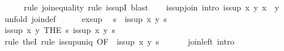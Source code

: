 \begin{isabellebody}
\ \ \ \ \isamarkupfalse%
\ {}rule\ join{}equality{}\ rule\ is{}supI{}\ blast{}\isanewline
\isanewline
\ \ \isamarkupfalse%
\ is{}sup{}join\ {}intro{}{}{}\ {}is{}sup\ x\ y\ {}x\ {}\ y{}{}\isanewline
\ \ \isamarkupfalse%
\ {}unfold\ join{}def{}\isanewline
\ \ \ \ \isamarkupfalse%
\ ex{}sup\ \isamarkupfalse%
\ s\ \ {}is{}sup\ x\ y\ s{}\ \isamarkupfalse%
\isanewline
\ \ \ \ \isamarkupfalse%
\ \isamarkupfalse%
\ {}is{}sup\ x\ y\ {}THE\ s{}\ is{}sup\ x\ y\ s{}{}\isanewline
\ \ \ \ \ \ \isamarkupfalse%
\ {}rule\ theI{}\ {}rule\ is{}sup{}uniq\ {}OF\ {}\ {}is{}sup\ x\ y\ s{}{}{}\isanewline
\ \ \isamarkupfalse%
\isanewline
\isanewline
\ \ \isamarkupfalse%
\ join{}left\ {}intro{}{}{}\isanewline

\end{isabellebody}
